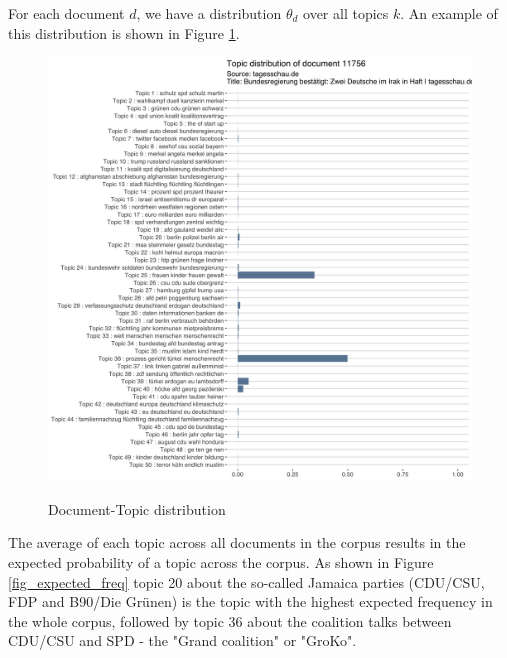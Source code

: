 \documentclass[12pt,a4paper,notitlepage]{article}
\begin{document}
For each document $d$, we have a distribution $\theta_d$ over all topics $k$. An example of this distribution is shown in Figure \ref{fig_doc_topic_distr}.

\begin{figure}[H]
\begin{center}
	\caption{Document-Topic distribution}
	\includegraphics[width=\textwidth]{../figs/doc_topic_distr}
	\label{fig_doc_topic_distr}
	\end{center}
\end{figure}

The average of each topic across all documents in the corpus results in the expected probability of a topic across the corpus. As shown in Figure \ref{fig_expected_freq} topic 20 about the so-called Jamaica parties (CDU/CSU, FDP and B90/Die Grünen) is the topic with the highest expected frequency in the whole corpus, followed by topic 36 about the coalition talks between CDU/CSU and SPD - the "Grand coalition" or "GroKo".
\end{document}
